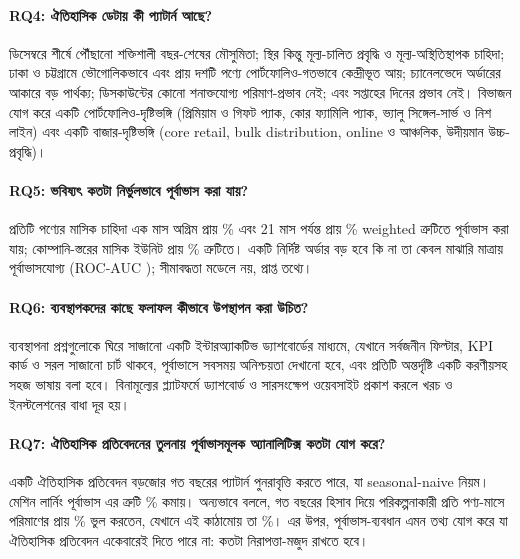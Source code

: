 \paragraph{RQ4: ঐতিহাসিক ডেটায় কী প্যাটার্ন আছে?}
ডিসেম্বরে শীর্ষে পৌঁছানো শক্তিশালী বছর-শেষের মৌসুমিতা; স্থির কিন্তু মূল্য-চালিত প্রবৃদ্ধি ও মূল্য-অস্থিতিস্থাপক চাহিদা; ঢাকা ও চট্টগ্রামে
ভৌগোলিকভাবে এবং প্রায় দশটি পণ্যে পোর্টফোলিও-গতভাবে কেন্দ্রীভূত আয়; চ্যানেলভেদে অর্ডারের আকারে বড় পার্থক্য; ডিসকাউন্টের কোনো শনাক্তযোগ্য
পরিমাণ-প্রভাব নেই; এবং সপ্তাহের দিনের প্রভাব নেই। বিভাজন যোগ করে একটি পোর্টফোলিও-দৃষ্টিভঙ্গি (প্রিমিয়াম ও গিফট প্যাক, কোর ফ্যামিলি
প্যাক, ভ্যালু সিঙ্গেল-সার্ভ ও নিশ লাইন) এবং একটি বাজার-দৃষ্টিভঙ্গি (core retail, bulk distribution, online ও আঞ্চলিক, উদীয়মান
উচ্চ-প্রবৃদ্ধি)।

\paragraph{RQ5: ভবিষ্যৎ কতটা নির্ভুলভাবে পূর্বাভাস করা যায়?}
প্রতিটি পণ্যের মাসিক চাহিদা এক মাস অগ্রিম প্রায় \BestRegWAPE\% এবং 21 মাস পর্যন্ত প্রায় \BestRecWAPE\% weighted ত্রুটিতে পূর্বাভাস করা
যায়; কোম্পানি-স্তরের মাসিক ইউনিট প্রায় \HWMAPE\% ত্রুটিতে। একটি নির্দিষ্ট অর্ডার বড় হবে কি না তা কেবল মাঝারি মাত্রায় পূর্বাভাসযোগ্য
(ROC-AUC \ClsAUC); সীমাবদ্ধতা মডেলে নয়, প্রাপ্ত তথ্যে।

\paragraph{RQ6: ব্যবস্থাপকদের কাছে ফলাফল কীভাবে উপস্থাপন করা উচিত?}
ব্যবস্থাপনা প্রশ্নগুলোকে ঘিরে সাজানো একটি ইন্টারঅ্যাকটিভ ড্যাশবোর্ডের মাধ্যমে, যেখানে সর্বজনীন ফিল্টার, KPI কার্ড ও সরল সাজানো চার্ট থাকবে,
পূর্বাভাসে সবসময় অনিশ্চয়তা দেখানো হবে, এবং প্রতিটি অন্তর্দৃষ্টি একটি করণীয়সহ সহজ ভাষায় বলা হবে। বিনামূল্যের প্ল্যাটফর্মে ড্যাশবোর্ড ও
সারসংক্ষেপ ওয়েবসাইট প্রকাশ করলে খরচ ও ইনস্টলেশনের বাধা দূর হয়।

\paragraph{RQ7: ঐতিহাসিক প্রতিবেদনের তুলনায় পূর্বাভাসমূলক অ্যানালিটিক্স কতটা যোগ করে?}
একটি ঐতিহাসিক প্রতিবেদন বড়জোর গত বছরের প্যাটার্ন পুনরাবৃত্তি করতে পারে, যা seasonal-naive নিয়ম। মেশিন লার্নিং পূর্বাভাস এর ত্রুটি
\GainVsSNaive\% কমায়। অন্যভাবে বললে, গত বছরের হিসাব দিয়ে পরিকল্পনাকারী প্রতি পণ্য-মাসে পরিমাণের প্রায় \SNaiveWAPE\% ভুল করতেন, যেখানে
এই কাঠামোয় তা \BestRegWAPE\%। এর উপর, পূর্বাভাস-ব্যবধান এমন তথ্য যোগ করে যা ঐতিহাসিক প্রতিবেদন একেবারেই দিতে পারে না: কতটা
নিরাপত্তা-মজুদ রাখতে হবে।

